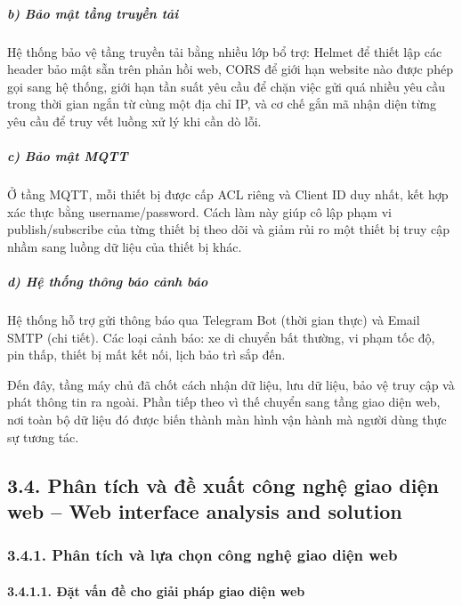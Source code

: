 \documentclass[a4paper]{extarticle}
\begin{document}
\subparagraph{b) Bảo mật tầng truyền
tải}\label{b-bux1ea3o-mux1eadt-tux1ea7ng-truyux1ec1n-tux1ea3i}

Hệ thống bảo vệ tầng truyền tải bằng nhiều lớp bổ trợ: Helmet để thiết
lập các header bảo mật sẵn trên phản hồi web, CORS để giới hạn website
nào được phép gọi sang hệ thống, giới hạn tần suất yêu cầu để chặn việc gửi quá
nhiều yêu cầu trong thời gian ngắn từ cùng một địa chỉ IP, và cơ chế gắn
mã nhận diện từng yêu cầu để truy vết luồng xử lý khi cần dò lỗi.

\subparagraph{c) Bảo mật MQTT}\label{c-bux1ea3o-mux1eadt-mqtt}

Ở tầng MQTT, mỗi thiết bị được cấp ACL riêng và Client ID duy nhất, kết
hợp xác thực bằng username/password. Cách làm này giúp cô lập phạm vi
publish/subscribe của từng thiết bị theo dõi và giảm rủi ro một thiết bị truy cập
nhầm sang luồng dữ liệu của thiết bị khác.

\subparagraph{d) Hệ thống thông báo cảnh
báo}\label{d-hux1ec7-thux1ed1ng-thuxf4ng-buxe1o-cux1ea3nh-buxe1o}

Hệ thống hỗ trợ gửi thông báo qua Telegram Bot (thời gian thực) và Email
SMTP (chi tiết). Các loại cảnh báo: xe di chuyển bất thường, vi phạm tốc
độ, pin thấp, thiết bị mất kết nối, lịch bảo trì sắp đến.

Đến đây, tầng máy chủ đã chốt cách nhận dữ liệu, lưu dữ liệu, bảo vệ
truy cập và phát thông tin ra ngoài. Phần tiếp theo vì thế chuyển sang
tầng giao diện web, nơi toàn bộ dữ liệu đó được biến thành màn hình vận
hành mà người dùng thực sự tương tác.

\subsection{3.4. Phân tích và đề xuất công nghệ giao diện web -- Web
interface analysis and solution}\label{34-phan-tich-va-de-xuat-cong-nghe-frontend}

\subsubsection{3.4.1. Phân tích và lựa chọn công nghệ giao diện web}

\paragraph{3.4.1.1. Đặt vấn đề cho giải pháp
giao diện web}\label{3141-ux111ux1eb7t-vux1ea5n-ux111ux1ec1-cho-giux1ea3i-phuxe1p-frontend}
\end{document}
